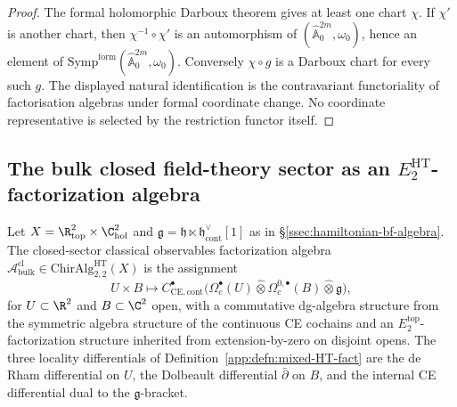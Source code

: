 \begin{proof}
The formal holomorphic Darboux theorem gives at least one chart
\(\chi\).  If \(\chi'\) is another chart, then
\(\chi^{-1}\circ\chi'\) is an automorphism of
\((\widehat{\mathbb A}^{2m}_0,\omega_0)\), hence an element of
\(\mathrm{Symp}^{\mathrm{form}}(\widehat{\mathbb A}^{2m}_0,\omega_0)\).
Conversely \(\chi\circ g\) is a Darboux chart for every such \(g\).  The
displayed natural identification is the contravariant functoriality of
factorisation algebras under formal coordinate change.  No coordinate
representative is selected by the restriction functor itself.
\end{proof}

\subsection{The bulk closed field-theory sector as an
\texorpdfstring{$E_2^{\mathrm{HT}}$-factorization}{E2-HT-factorization}
algebra}\label{app:hfc:bulk-as-fact-cat}

\begin{constr}\label{app:constr:bulk-fact-Ed}
Let $X=\R^2_{\mathrm{top}}\times\C^2_{\mathrm{hol}}$ and
$\mathfrak g=\mathfrak h\ltimes\mathfrak h^\vee_{\mathrm{cont}}[1]$ as
in \S\ref{ssec:hamiltonian-bf-algebra}.  The closed-sector
classical observables factorization algebra
$\mathcal A^{\mathrm{cl}}_{\mathrm{bulk}}\in
\mathrm{ChirAlg}^{\mathrm{HT}}_{2,2}(X)$ is the assignment
\[
  U\times B\longmapsto
   C^\bullet_{\mathrm{CE},\mathrm{cont}}\bigl(
     \Omega^\bullet_c(U)\widehat\otimes
     \Omega^{0,\bullet}_c(B)\widehat\otimes\mathfrak g\bigr),
\]
for $U\subset\R^2$ and $B\subset\C^2$ open, with a commutative
dg-algebra structure from the symmetric algebra structure of the
continuous CE cochains and an \(E_2^{\mathrm{top}}\)-factorization
structure inherited from extension-by-zero on disjoint opens.  The three
locality differentials of
Definition~\ref{app:defn:mixed-HT-fact} are the de Rham differential
on $U$, the Dolbeault differential $\bar\partial$ on $B$, and the
internal CE differential dual to the $\mathfrak g$-bracket.
\end{constr}


